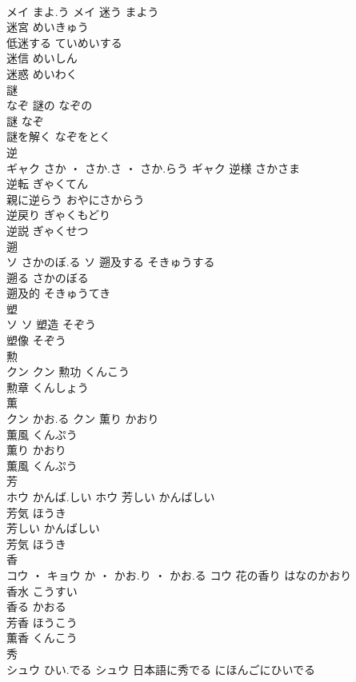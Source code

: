 \documentclass[8pt]{extreport}
\begin{document}
\begin{CJK}{UTF8}{min}
\\	メイ	まよ.う	メイ	迷う	まよう	
\\	迷宮	めいきゅう	
\\	低迷する	ていめいする	
\\	迷信	めいしん	
\\	迷惑	めいわく	
\\	謎	
\\	なぞ		謎の	なぞの	
\\	謎	なぞ	
\\	謎を解く	なぞをとく	
\\	逆	
\\	ギャク	さか ・ さか.さ ・ さか.らう	ギャク	逆様	さかさま	
\\	逆転	ぎゃくてん	
\\	親に逆らう	おやにさからう	
\\	逆戻り	ぎゃくもどり	
\\	逆説	ぎゃくせつ	
\\	遡	
\\	ソ	さかのぼ.る	ソ	遡及する	そきゅうする	
\\	遡る	さかのぼる	
\\	遡及的	そきゅうてき	
\\	塑	
\\	ソ		ソ	塑造	そぞう	
\\	塑像	そぞう	
\\	勲	
\\	クン		クン	勲功	くんこう	
\\	勲章	くんしょう	
\\	薫	
\\	クン	かお.る	クン	薫り	かおり	
\\	薫風	くんぷう	
\\	薫り	かおり	
\\	薫風	くんぷう	
\\	芳	
\\	ホウ	かんば.しい	ホウ	芳しい	かんばしい	
\\	芳気	ほうき	
\\	芳しい	かんばしい	
\\	芳気	ほうき	
\\	香	
\\	コウ ・ キョウ	か ・ かお.り ・ かお.る	コウ	花の香り	はなのかおり	
\\	香水	こうすい	
\\	香る	かおる	
\\	芳香	ほうこう	
\\	薫香	くんこう	
\\	秀	
\\	シュウ	ひい.でる	シュウ	日本語に秀でる	にほんごにひいでる	

\end{CJK}
\end{document}
